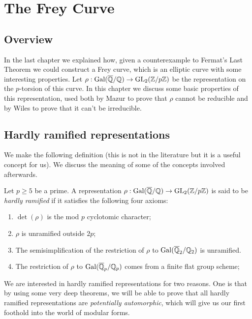 \chapter{The Frey Curve}

\section{Overview}

In the last chapter we explained how, given a counterexample to Fermat's Last Theorem we could construct a Frey curve, which is an elliptic curve with some interesting properties. Let $\rho:\operatorname{Gal}(\overline{\mathbb{Q}}/\mathbb{Q})\to\operatorname{GL}_2(\mathbb{Z}/p\mathbb{Z})$ be the representation on the $p$-torsion of this curve. In this chapter we discuss some basic properties of this representation, used both by Mazur to prove that $\rho$ cannot be reducible and by Wiles to prove that it can't be irreducible.

\section{Hardly ramified representations}

We make the following definition (this is not in the literature but it is a useful concept for us). We discuss the meaning of some of the concepts involved afterwards.

\begin{definition}\label{hardly_ramified} Let $p\geq5$ be a prime. A representation $\rho: \operatorname{Gal}(\overline{\mathbb{Q}}/\mathbb{Q})\to \operatorname{GL}_2(\mathbb{Z}/p\mathbb{Z})$ is said to be \emph{hardly ramified} if it satisfies the following four axioms:
  \begin{enumerate}
  \item $\det(\rho)$ is the mod $p$ cyclotomic character;
  \item $\rho$ is unramified outside $2p$;
  \item The semisimplification of the restriction of $\rho$ to $\operatorname{Gal}(\overline{\mathbb{Q}}_2/\mathbb{Q}_2)$ is unramified.
  \item The restriction of $\rho$ to $\operatorname{Gal}(\overline{\mathbb{Q}}_p/\mathbb{Q}_p)$ comes from a finite flat group scheme;
  \end{enumerate}
\end{definition}

We are interested in hardly ramified representations for two reasons. One is that by using some very deep theorems, we will be able to prove that all hardly ramified representations are \emph{potentially automorphic}, which will give us our first foothold into the world of modular forms.

